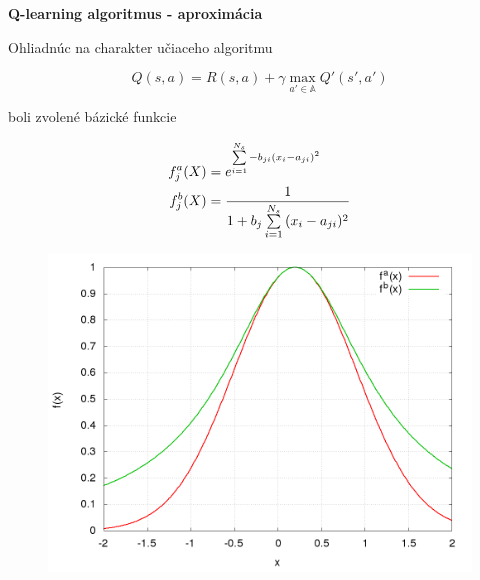 \documentclass[xcolor=dvipsnames]{beamer}
\begin{document}
\begin{frame}{\bf Q-learning algoritmus - aproximácia}

Ohliadnúc na charakter učiaceho algoritmu

\begin{equation} \label{eu_eqn}
Q(s,a) = R(s,a) + \gamma \max_{a' \in \mathbb{A}} Q'(s', a') \nonumber
\end{equation}



\begin{minipage}{.5\textwidth}
  boli zvolené bázické funkcie

  \begin{align}
    f_j^a(\boldmath{X}) &= e^{ \sum\limits_{i=1}^{N_s}{-b_{ji}(x_i - a_{ji})^2} } \nonumber \\
    f_j^b(\boldmath{X}) &= \frac{1}{1 + b_{j} \sum\limits_{i=1}^{N_s}{(x_i - a_{ji})^2}} \nonumber
\end{align}


\end{minipage}%
\begin{minipage}{.5\textwidth}

  \begin{figure}[!htb]
  \centering
  \includegraphics[scale=.2]{../pictures/gaussian_1D.png}
  \end{figure}

\end{minipage}





\end{frame}
\end{document}
